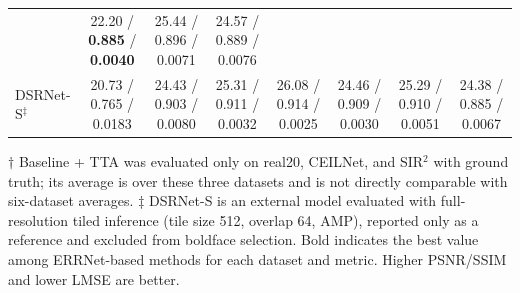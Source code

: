\begin{table}[t]
{\begin{tabular}{lccccccc}
& 22.20 / \textbf{0.885} / \textbf{0.0040}
& 25.44 / 0.896 / 0.0071
& 24.57 / 0.889 / 0.0076 \\
DSRNet-S$^\ddagger$
& 20.73 / 0.765 / 0.0183
& 24.43 / 0.903 / 0.0080
& 25.31 / 0.911 / 0.0032
& 26.08 / 0.914 / 0.0025
& 24.46 / 0.909 / 0.0030
& 25.29 / 0.910 / 0.0051
& 24.38 / 0.885 / 0.0067 \\
\bottomrule
\end{tabular}}
\vspace{2pt}
\parbox{0.98\textwidth}{\footnotesize
\(\dagger\) Baseline + TTA was evaluated only on real20, CEILNet, and SIR$^2$ with ground truth; its average is over these three datasets and is not directly comparable with six-dataset averages.
\(\ddagger\) DSRNet-S is an external model evaluated with full-resolution tiled inference (tile size 512, overlap 64, AMP), reported only as a reference and excluded from boldface selection.
Bold indicates the best value among ERRNet-based methods for each dataset and metric. Higher PSNR/SSIM and lower LMSE are better.}
\end{table}
